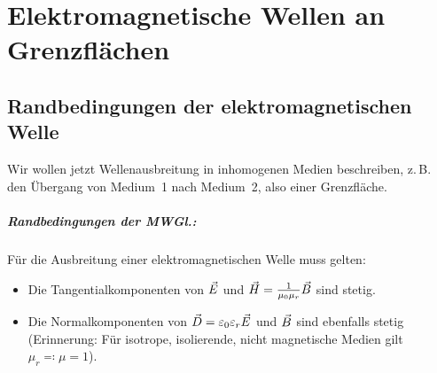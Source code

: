 

\chapter{Elektromagnetische Wellen an Grenzflächen}

\section{Randbedingungen der elektromagnetischen Welle}
Wir wollen jetzt Wellenausbreitung in inhomogenen Medien beschreiben,
z.\,B. den Übergang von Medium~1 nach Medium~2, also einer
Grenzfläche.

\paragraph{Randbedingungen der MWGl.:}
Für die Ausbreitung einer elektromagnetischen Welle muss gelten:
\begin{itemize}
\item Die Tangentialkomponenten von $\vec{E}$ und
  $\vec{H}=\frac{1}{\mu_0\mu_r}\vec{B}$ sind stetig. 
\item Die Normalkomponenten von $\vec{D}=\varepsilon_0\varepsilon_r\vec{E}$ und $\vec{B}$ sind
ebenfalls stetig (Erinnerung: Für isotrope, isolierende, nicht
magnetische Medien gilt $\mu_r\eqqcolon\mu=1$).
\end{itemize}

